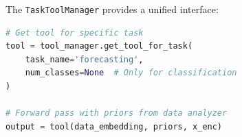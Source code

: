 The \texttt{TaskToolManager} provides a unified interface:

\begin{lstlisting}[language=Python, basicstyle=\small\ttfamily]
# Get tool for specific task
tool = tool_manager.get_tool_for_task(
    task_name='forecasting',
    num_classes=None  # Only for classification
)

# Forward pass with priors from data analyzer
output = tool(data_embedding, priors, x_enc)
\end{lstlisting}

\newpage

